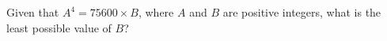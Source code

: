 Given that $A^4=75600\times B$, where $A$ and $B$ are positive integers, what is the least possible value of $B$?
